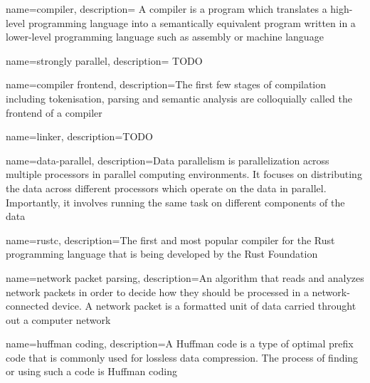 
\makeglossaries

\renewcommand*{\glstextformat}[1]{\textcolor{black}{%
\ul{\mbox{#1}}}}

{
    name=compiler,
    description={
    A compiler is a program which translates a high-level
programming language into a semantically equivalent program written in a
lower-level programming language such as assembly or machine language}
}

{
    name=strongly parallel,
    description={ TODO }
}

{
    name=compiler frontend,
    description={The first few stages of compilation including tokenisation,
parsing and semantic analysis are colloquially called the frontend of a compiler}
}

{
    name=linker,
    description={TODO}
}

{
    name=data-parallel,
    description={Data parallelism is parallelization across multiple processors
in parallel computing environments. It focuses on distributing the data across
different processors which operate on the data in parallel. Importantly, it
involves running the same task on different components of the data}
}

{
    name=rustc,
    description={The first and most popular compiler for the Rust programming
language that is being developed by the Rust Foundation}
}

 {
    name=network packet parsing,
    description={An algorithm that reads and analyzes network packets in order
to decide how they should be processed in a network-connected device. A network
packet is a formatted unit of data carried throught out a computer network}
}

{
    name=huffman coding,
    description={A Huffman code is a type of optimal prefix code that is
commonly used for lossless data compression. The process of finding or using
such a code is Huffman coding}
}




